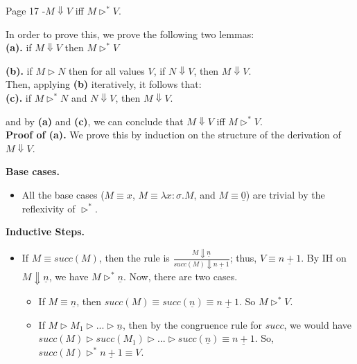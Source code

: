 \begin{problem}{Page 17}
    -$M \Downarrow V$ iff $M \rhd^* V$.
\end{problem}

\begin{solution}
    In order to prove this, we prove the following two lemmas: \\

    \textbf{(a).} if $M \Downarrow V$ then $M \rhd^* V$

    \textbf{(b).} if $M \rhd N$ then for all values $V$, if $N \Downarrow V$, then $M \Downarrow V$. \\
    
    Then, applying \textbf{(b)} iteratively, it follows that: \\

    \textbf{(c).} if $M \rhd^* N$ and $N \Downarrow V$, then $M \Downarrow V$.

    and by \textbf{(a)} and \textbf{(c)}, we can conclude that $M \Downarrow V$ iff $M \rhd^* V$. \\
    \textbf{Proof of (a).} We prove this by induction on the structure of the derivation of $M \Downarrow V$. 

    \textbf{Base cases.}
    \begin{itemize}
        \item All the base cases ($M \equiv x$, $M \equiv \lambda x:\sigma.M$, and $M \equiv \underline{0}$) are trivial by the reflexivity of $\rhd^*$.
    \end{itemize}

    \textbf{Inductive Steps.}
    \begin{itemize}
        \item If $M \equiv succ(M)$, then the rule is $\frac{M \Downarrow \underline{n}}{succ(M) \Downarrow \underline{n+1}}$; thus, $V \equiv \underline{n+1}$.
              By IH on $M \Downarrow \underline{n}$, we have $M \rhd^* \underline{n}$. Now, there are two cases.
              \begin{itemize}
                \item If $M \equiv \underline{n}$, then $succ(M) \equiv succ(\underline{n}) \equiv \underline{n+1}$. So $M \rhd^* V$.
                \item If $M \rhd M_1 \rhd ... \rhd \underline{n}$, then by the congruence rule for $succ$, we would have $succ(M) \rhd succ(M_1) \rhd ... \rhd succ(\underline{n}) \equiv \underline{n+1}$.
                      So, $succ(M) \rhd^* \underline{n+1} \equiv V$.
              \end{itemize}
        

\end{itemize}
\end{solution}
